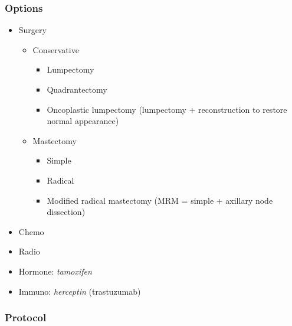 \documentclass[
  14pt,
]{extarticle}
\providecommand{\tightlist}{%
  \setlength{\itemsep}{0pt}\setlength{\parskip}{0pt}}
\begin{document}
\hypertarget{options}{%
\subsubsection{Options}\label{options}}

\begin{itemize}
\tightlist
\item
  Surgery

  \begin{itemize}
  \tightlist
  \item
    Conservative

    \begin{itemize}
    \tightlist
    \item
      Lumpectomy
    \item
      Quadrantectomy
    \item
      Oncoplastic lumpectomy (lumpectomy + reconstruction to restore
      normal appearance)
    \end{itemize}
  \item
    Mastectomy

    \begin{itemize}
    \tightlist
    \item
      Simple
    \item
      Radical
    \item
      Modified radical mastectomy (MRM = simple + axillary node
      dissection)
    \end{itemize}
  \end{itemize}
\item
  Chemo
\item
  Radio
\item
  Hormone: \emph{tamoxifen}
\item
  Immuno: \emph{herceptin} (trastuzumab)
\end{itemize}

\hypertarget{protocol}{%
\subsubsection{Protocol}\label{protocol}}
\end{document}
